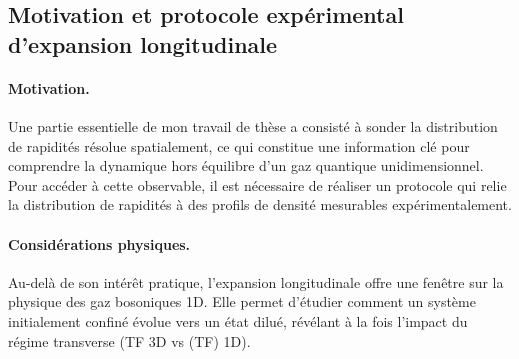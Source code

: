 \subsection{Motivation et protocole expérimental d’expansion longitudinale}

\paragraph{Motivation.}
Une partie essentielle de mon travail de thèse a consisté à sonder la distribution de rapidités résolue spatialement, ce qui constitue une information clé pour comprendre la dynamique hors équilibre d’un gaz quantique unidimensionnel. Pour accéder à cette observable, il est nécessaire de réaliser un protocole qui relie la distribution de rapidités à des profils de densité mesurables expérimentalement. %

\paragraph{Considérations physiques.}
Au-delà de son intérêt pratique, l’expansion longitudinale offre une fenêtre sur la physique des gaz bosoniques 1D. Elle permet d’étudier comment un système initialement confiné évolue vers un état dilué, révélant à la fois l’impact du régime transverse (\gls{TF} 3D vs (\gls{TF}) 1D).%


